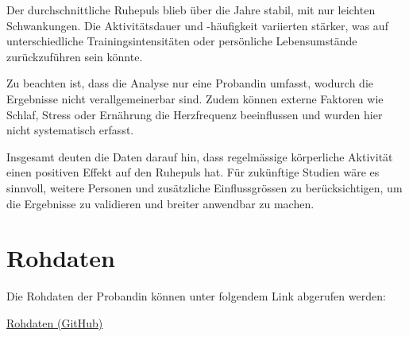 \documentclass[a4paper,12pt]{scrartcl}
\begin{document}
Der durchschnittliche Ruhepuls blieb über die Jahre stabil, mit nur leichten Schwankungen. Die Aktivitätsdauer und -häufigkeit variierten stärker, was auf unterschiedliche Trainingsintensitäten oder persönliche Lebensumstände zurückzuführen sein könnte.

Zu beachten ist, dass die Analyse nur eine Probandin umfasst, wodurch die Ergebnisse nicht verallgemeinerbar sind. Zudem können externe Faktoren wie Schlaf, Stress oder Ernährung die Herzfrequenz beeinflussen und wurden hier nicht systematisch erfasst.

Insgesamt deuten die Daten darauf hin, dass regelmässige körperliche Aktivität einen positiven Effekt auf den Ruhepuls hat. Für zukünftige Studien wäre es sinnvoll, weitere Personen und zusätzliche Einflussgrössen zu berücksichtigen, um die Ergebnisse zu validieren und breiter anwendbar zu machen.






\appendix
\section{Rohdaten}
Die Rohdaten der Probandin können unter folgendem Link abgerufen werden:

\href{https://github.com/Fredeys/FHGR_DS_Sport_1}{Rohdaten (GitHub)}
\end{document}
